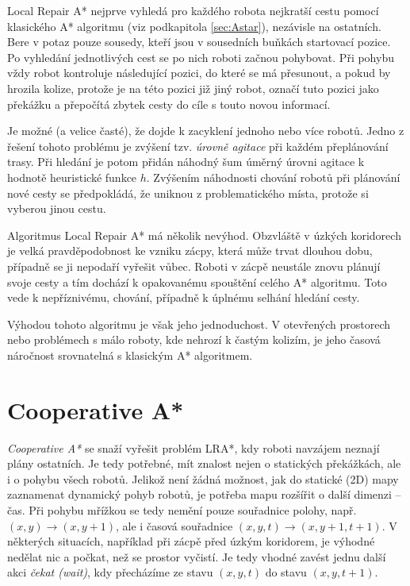 Local Repair A* nejprve vyhledá pro každého robota nejkratší cestu pomocí klasického A* algoritmu (viz podkapitola \ref{sec:Astar}), nezávisle na ostatních. Bere v potaz pouze sousedy, kteří jsou v sousedních buňkách startovací pozice. Po vyhledání jednotlivých cest se po nich roboti začnou pohybovat. Při pohybu vždy robot kontroluje následující pozici, do které se má přesunout, a pokud by hrozila kolize, protože je na této pozici již jiný robot, označí tuto pozici jako překážku a přepočítá zbytek cesty do cíle s touto novou informací.


Je možné (a velice časté), že dojde k zacyklení jednoho nebo více robotů. Jedno z řešení tohoto problému je zvýšení tzv. \emph{úrovně agitace} při každém přeplánování trasy. Při hledání je potom přidán náhodný šum úměrný úrovni agitace k hodnotě heuristické funkce $h$. Zvýšením náhodnosti chování robotů při plánování nové cesty se předpokládá, že uniknou z problematického místa, protože si vyberou jinou cestu.

Algoritmus Local Repair A* má několik nevýhod. Obzvláště v úzkých koridorech je velká pravděpodobnost ke vzniku zácpy, která může trvat dlouhou dobu, případně se ji nepodaří vyřešit vůbec. Roboti v zácpě neustále znovu plánují svoje cesty a tím dochází k opakovanému spouštění celého A* algoritmu. Toto vede k nepříznivému,  chování, případně k úplnému selhání hledání cesty.

Výhodou tohoto algoritmu je však jeho jednoduchost. V otevřených prostorech nebo problémech s málo roboty, kde nehrozí k častým kolizím, je jeho časová náročnost srovnatelná s klasickým A* algoritmem.


\section{Cooperative A*}\label{sec:Coop}
\emph{Cooperative A*} se snaží vyřešit problém LRA*, kdy roboti navzájem neznají plány ostatních. Je tedy potřebné, mít znalost nejen o statických překážkách, ale i o pohybu všech robotů. Jelikož není žádná možnost, jak do statické (2D) mapy zaznamenat dynamický pohyb robotů, je potřeba mapu rozšířit o další dimenzi -- čas. Při pohybu mřížkou se tedy nemění pouze souřadnice polohy, např. $\left(x,y\right)\to\left(x,y+1\right)$, ale i časová souřadnice $\left(x,y,t\right)\to\left(x,y+1,t+1\right)$. V některých situacích, například při zácpě před úzkým koridorem, je výhodné nedělat nic a počkat, než se prostor vyčistí. Je tedy vhodné zavést jednu další akci \emph{čekat (wait)}, kdy přecházíme ze stavu $\left(x,y,t\right)$ do stavu $\left(x,y,t+1\right)$.

